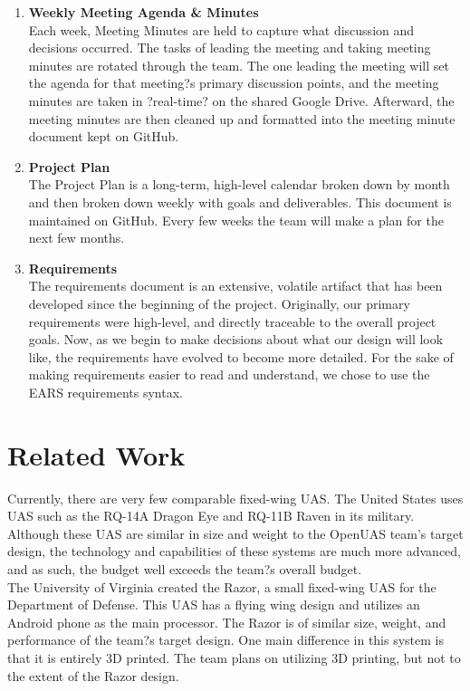 ﻿\documentclass{article}
\begin{document}
\begin{enumerate}
\item \textbf{Weekly Meeting Agenda \& Minutes}\\Each week, Meeting Minutes are held to capture what discussion and decisions occurred. The tasks of leading the meeting and taking meeting minutes are rotated through the team. The one leading the meeting will set the agenda for that meeting?s primary discussion points, and the meeting minutes are taken in ?real-time? on the shared Google Drive. Afterward, the meeting minutes are then cleaned up and formatted into the meeting minute document kept on GitHub.
\item \textbf{Project Plan}\\ The Project Plan is a long-term, high-level calendar broken down by month and then broken down weekly with goals and deliverables. This document is maintained on GitHub. Every few weeks the team will make a plan for the next few months.
\item \textbf{Requirements}\\ The requirements document is an extensive, volatile artifact that has been developed since the beginning of the project. Originally, our primary requirements were high-level, and directly traceable to the overall project goals. Now, as we begin to make decisions about what our design will look like, the requirements have evolved to become more detailed. For the sake of making requirements easier to read and understand, we chose to use the EARS \cite{Terzakis2013} requirements syntax.
\end{enumerate}

\section{Related Work}
\noindent Currently, there are very few comparable fixed-wing UAS. The United States uses UAS such as the RQ-14A Dragon Eye and RQ-11B Raven in its military. Although these UAS are similar in size and weight to the OpenUAS team's target design, the technology and capabilities of these systems are much more advanced, and as such, the budget well exceeds the team?s overall budget.\\

\noindent The University of Virginia created the Razor, a small fixed-wing UAS for the Department of Defense. This UAS has a flying wing design and utilizes an Android phone as the main processor. The Razor is of similar size, weight, and performance of the team?s target design. One main difference in this system is that it is entirely 3D printed. The team plans on utilizing 3D printing, but not to the extent of the Razor design.\\
\end{document}
